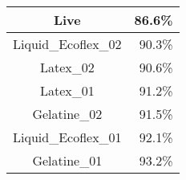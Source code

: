 \begin{tabular}{ c   r }
    Live                & 86.6\% \\ \hline\hline
    Liquid\_Ecoflex\_02 & 90.3\% \\
    Latex\_02           & 90.6\% \\
    Latex\_01           & 91.2\% \\
    Gelatine\_02        & 91.5\% \\
    Liquid\_Ecoflex\_01 & 92.1\% \\
    Gelatine\_01        & 93.2\%
\end{tabular}
